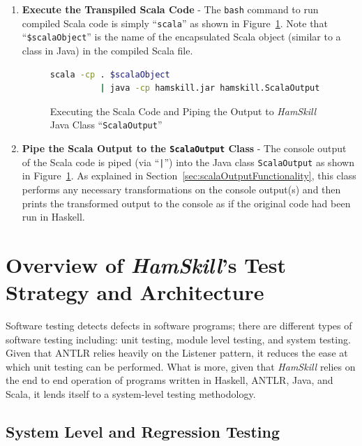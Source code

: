 \documentclass{report}
\begin{document}
\begin{enumerate}
\item \textbf{Execute the Transpiled Scala Code} - The \texttt{bash} command to run compiled Scala code is simply ``\texttt{scala}'' as shown in Figure~\ref{fig:runScalaAndConvertOutput}.  Note that ``\texttt{\$scalaObject}'' is the name of the encapsulated Scala object (similar to a class in Java) in the compiled Scala file.

\begin{figure}[H]
\begin{mdframed}
\begin{lstlisting}[language=bash]
scala -cp . $scalaObject 
          | java -cp hamskill.jar hamskill.ScalaOutput
\end{lstlisting}
\end{mdframed}
\caption{Executing the Scala Code and Piping the Output to \textit{HamSkill} Java Class ``\texttt{ScalaOutput}''}\label{fig:runScalaAndConvertOutput}
\end{figure}

\item \textbf{Pipe the Scala Output to the \texttt{ScalaOutput} Class} - The console output of the Scala code is piped (via ``\texttt{|}'') into the Java class \texttt{ScalaOutput} as shown in Figure~\ref{fig:runScalaAndConvertOutput}.  As explained in Section~\ref{sec:scalaOutputFunctionality}, this class performs any necessary transformations on the console output(s) and then prints the transformed output to the console as if the original code had been run in Haskell.

\end{enumerate} 


\section{Overview of \textit{HamSkill}'s Test Strategy and Architecture}

Software testing detects defects in software programs; there are different types of software testing including: unit testing, module level testing, and system testing.  Given that ANTLR relies heavily on the Listener pattern, it reduces the ease at which unit testing can be performed.  What is more, given that \textit{HamSkill} relies on the end to end operation of programs written in Haskell, ANTLR, Java, and Scala, it lends itself to a system-level testing methodology.

\subsection{System Level and Regression Testing}
\end{document}
